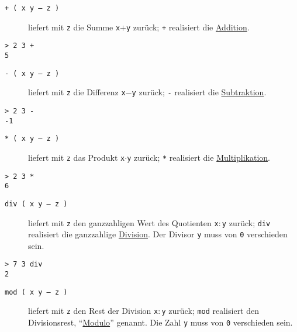 \begin{description}
\item[\texttt{+ ( x y -- z )}] liefert mit \verb|z| die Summe \verb|x|$+$\verb|y| zurück; \verb|+| realisiert die \href{http://de.wikipedia.org/wiki/Addition}{Addition}.
\end{description}

\begin{verbatim}
> 2 3 +
5
\end{verbatim}

\begin{description}
\item[\texttt{- ( x y -- z )}] liefert mit \verb|z| die Differenz \verb|x|$-$\verb|y| zurück; \verb|-| realisiert die \href{http://de.wikipedia.org/wiki/Subtraktion}{Subtraktion}.
\end{description}

\begin{verbatim}
> 2 3 -
-1
\end{verbatim}

\begin{description}
\item[\texttt{* ( x y -- z )}] liefert mit \verb|z| das Produkt \verb|x|$\cdot$\verb|y| zurück; \verb|*| realisiert die \href{http://de.wikipedia.org/wiki/Multiplikation}{Multiplikation}.
\end{description}

\begin{verbatim}
> 2 3 *
6
\end{verbatim}

\begin{description}
\item[\texttt{div ( x y -- z )}] liefert mit \verb|z| den ganzzahligen Wert des Quotienten \verb|x|$:$\verb|y| zurück; \verb|div| realisiert die ganzzahlige \href{http://de.wikipedia.org/wiki/Division\_(Mathematik)}{Division}. Der Divisor \verb|y| muss von \verb|0| verschieden sein.
\end{description}

\begin{verbatim}
> 7 3 div
2
\end{verbatim}

\begin{description}
\item[\texttt{mod ( x y -- z )}] liefert mit \verb|z| den Rest der Division \verb|x|$:$\verb|y| zurück; \verb|mod| realisiert den Divisionsrest, "`\href{http://de.wikipedia.org/wiki/Modulo#Modulo}{Modulo}"' genannt.
Die Zahl \verb|y| muss von \verb|0| verschieden sein.
\end{description}

